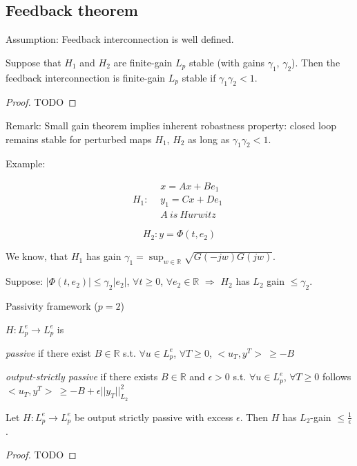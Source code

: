 \subsection{Feedback theorem}

Assumption: Feedback interconnection is well defined.

\begin{Theorem}
 Suppose that $H_1$ and $H_2$ are finite-gain $L_p$ stable (with gains $\gamma_1$, $\gamma_2$).
 Then the feedback interconnection is finite-gain $L_p$ stable if $\gamma_1\gamma_2<1$.

 \begin{proof}
  TODO
 \end{proof}
\end{Theorem}

Remark: Small gain theorem implies inherent robastness property: closed loop remains stable
for perturbed maps $H_1$, $H_2$ as long as $\gamma_1\gamma_2<1$.

Example:

\begin{equation}
H_1:
\begin{split}
 &x=Ax+Be_1\\
 &y_1=Cx+De_1\\
 &A\ is\ Hurwitz
\end{split}
\end{equation}


\begin{equation}
H_2: y=\Phi(t,e_2)
\end{equation}

We know, that $H_1$ has gain $\gamma_1=\sup_{w\in\mathbb{R}}\sqrt{G(-jw)G(jw)}$.

Suppose: $|\Phi(t,e_2)|\le\gamma_2|e_2|$, $\forall t\ge0$, $\forall e_2\in\mathbb{R}$
$\Rightarrow$ $H_2$ has $L_2$ gain $\le\gamma_2$.

Passivity framework ($p=2$)

\begin{Definition}
 $H:L_p^e\rightarrow L_p^e$ is

 {\it passive} if there exist $B\in\mathbb{R}$ s.t. $\forall u\in L_p^e$, $\forall T\ge0$,
 $<u_T,y^T>\ \ge -B$

 {\it output-strictly passive} if there exists $B\in\mathbb{R}$ and $\epsilon>0$ s.t.
 $\forall u\in L_p^e$, $\forall T\ge0$ follows  $<u_T,y^T>\ \ge -B+\epsilon ||y_T||_{L_2}^2$
\end{Definition}

\begin{Lemma}
 Let $H:L_p^e\rightarrow L_p^e$ be output strictly passive with excess $\epsilon$. Then $H$
 has $L_2$-gain $\le\frac{1}{\epsilon}$.
 \begin{proof}
	TODO
\end{proof}	
\end{Lemma}

